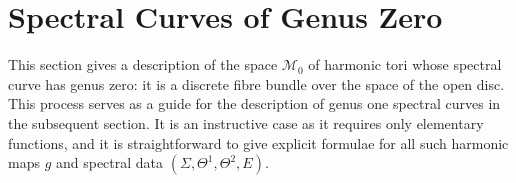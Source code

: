 \documentclass{article}
\begin{document}
\section{Spectral Curves of Genus Zero}\label{sec:Genus Zero}

This section gives a description of the space $\mathcal{M}_0$ of harmonic tori whose spectral curve has genus zero: it is a discrete fibre bundle over the space of the open disc. This process serves as a guide for the description of genus one spectral curves in the subsequent section. It is an instructive case as it requires only elementary functions, and it is straightforward to give explicit formulae for all such harmonic maps $g$ and spectral data $(\Sigma,\Theta^1,\Theta^2,E)$. 

\end{document}
